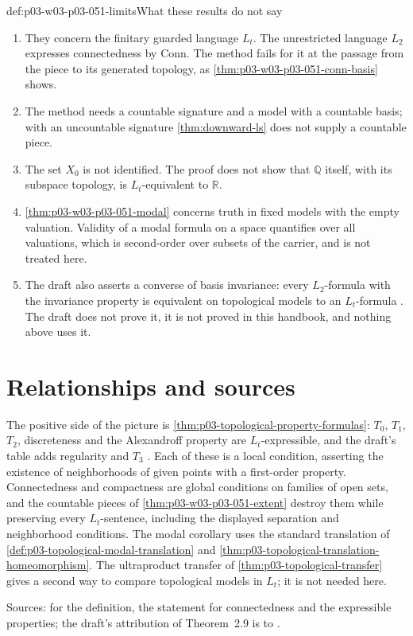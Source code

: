\begin{hbwarning}{def:p03-w03-p03-051-limits}{What these results do not say}
\begin{enumerate}
\item They concern the finitary guarded language \(L_t\). The unrestricted
      language \(L_2\) expresses connectedness by \(\mathrm{Conn}\). The
      method fails for it at the passage from the piece to its generated
      topology, as \cref{thm:p03-w03-p03-051-conn-basis} shows.
\item The method needs a countable signature and a model with a countable
      basis; with an uncountable signature \cref{thm:downward-ls} does
      not supply a countable piece.
\item The set \(X_0\) is not identified. The proof does not show that
      \(\mathbb Q\) itself, with its subspace topology, is
      \(L_t\)-equivalent to \(\mathbb R\).
\item \cref{thm:p03-w03-p03-051-modal} concerns truth in fixed models with
      the empty valuation. Validity of a modal formula on a space quantifies
      over all valuations, which is second-order over subsets of the
      carrier, and is not treated here.
\item The draft also asserts a converse of basis invariance: every
      \(L_2\)-formula with the invariance property is equivalent on
      topological models to an \(L_t\)-formula
      \cite[Theorem~2.3, p.~9]{TenCateGabelaiaSustretov2006TopologyDraft}.
      The draft does not prove it, it is not proved in this handbook, and
      nothing above uses it.
\end{enumerate}
\end{hbwarning}

\section{Relationships and sources}
\label{sec:p03-w03-p03-051-relationships}

The positive side of the picture is
\cref{thm:p03-topological-property-formulas}: \(T_0\), \(T_1\), \(T_2\),
discreteness and the Alexandroff property are \(L_t\)-expressible, and the
draft's table adds regularity and \(T_3\)
\cite[Table~1, p.~12]{TenCateGabelaiaSustretov2006TopologyDraft}. Each of
these is a local condition, asserting the existence of neighborhoods of
given points with a first-order property. Connectedness and compactness are
global conditions on families of open sets, and the countable pieces of
\cref{thm:p03-w03-p03-051-extent} destroy them while preserving every
\(L_t\)-sentence, including the displayed separation and neighborhood
conditions. The modal corollary uses the standard translation of
\cref{def:p03-topological-modal-translation} and
\cref{thm:p03-topological-translation-homeomorphism}. The ultraproduct
transfer of \cref{thm:p03-topological-transfer} gives a second way to
compare topological models in \(L_t\); it is not needed here.

Sources: \cite[Definition~13, p.~11; Theorem~2.9 and Table~1,
p.~12]{TenCateGabelaiaSustretov2006TopologyDraft} for the definition, the
statement for connectedness and the expressible properties; the draft's
attribution of Theorem~2.9 is to \cite{FlumZiegler1980TopologicalModelTheory}.
